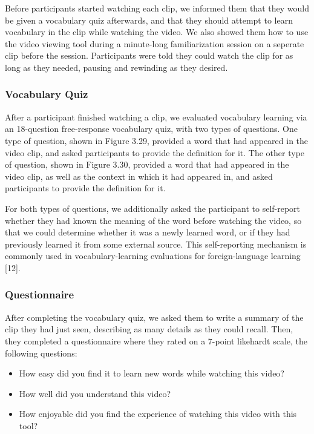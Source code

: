 \documentclass{sigchi}
\begin{document}
Before participants started watching each clip, we
informed them that they would be given a vocabulary
quiz afterwards, and that they should attempt to learn vocabulary
in the clip while watching the video. We also
showed them how to use the video viewing tool
during a minute-long familiarization session on a seperate clip
before the session. Participants were told 
they could watch the clip for as long as they
needed, pausing and rewinding as they desired.

\subsubsection{Vocabulary Quiz}

After a participant finished watching a clip, we evaluated vocabulary learning via an 18-question free-response vocabulary quiz, with two types of questions. One type of question, shown in Figure 3.29, provided a word that had appeared in the video clip, and asked participants to provide the definition for it. The other type of question, shown in Figure 3.30, provided a word that had appeared in the video clip, as well as the context in which it had appeared in, and asked participants to provide the definition for it.

For both types of questions, we additionally asked the participant to self-report whether they had known the meaning of the word before watching the video, so that we could determine whether it was a newly learned word, or if they had previously learned it from some external source. This self-reporting mechanism is commonly used in vocabulary-learning evaluations for foreign-language learning [12].

\subsubsection{Questionnaire}

After completing the vocabulary quiz, we asked them to write a summary of the clip they had
just seen, describing as many details as they could recall. Then, they completed
a questionnaire where they rated on a 7-point likehardt scale, the following questions:

\begin{itemize}[noitemsep]
\item How easy did you find it to learn new words while watching this video?
\item How well did you understand this video?
\item How enjoyable did you find the experience of watching this video with this tool?
\end{itemize}
\end{document}
